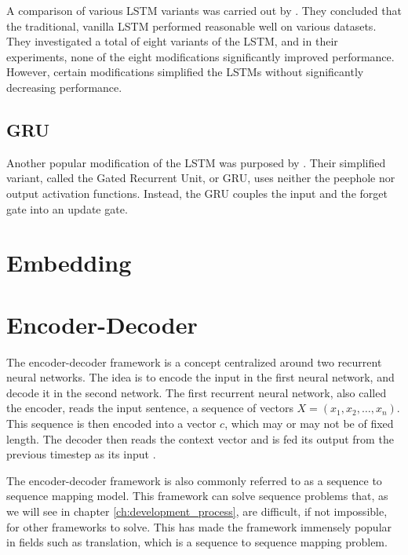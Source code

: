 A comparison of various LSTM variants was carried out by \citep{greff2016lstm}. They concluded that the traditional, vanilla LSTM performed reasonable well on various datasets. They investigated a total of eight variants of the LSTM, and in their experiments, none of the eight modifications significantly improved performance. However, certain modifications simplified the LSTMs without significantly decreasing performance. 

\subsection{GRU}
Another popular modification of the LSTM was purposed by \citep{chung2014empirical}. Their simplified variant, called the Gated Recurrent Unit, or GRU, uses neither the peephole nor output activation functions. Instead, the GRU couples the input and the forget gate into an update gate. 


\section{Embedding}



\section{Encoder-Decoder}
\label{sec:encoder-decoder}
The encoder-decoder framework is a concept centralized around two recurrent neural networks. The idea is to encode the input in the first neural network, and decode it in the second network. The first recurrent neural network, also called the encoder, reads the input sentence, a sequence of vectors \(X = (x_{1}, x_{2}, \ldots, x_{n})\). This sequence is then encoded into a vector \(c\), which may or may not be of fixed length. The decoder then reads the context vector and is fed its output from the previous timestep as its input \citep{sutskever2014sequence}.

The encoder-decoder framework is also commonly referred to as a sequence to sequence mapping model. This framework can solve sequence problems that, as we will see in chapter \ref{ch:development_process}, are difficult, if not impossible, for other frameworks to solve. This has made the framework immensely popular in fields such as translation, which is a sequence to sequence mapping problem.